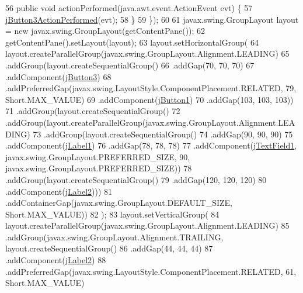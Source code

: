 \begin{DoxyCode}
56             \textcolor{keyword}{public} \textcolor{keywordtype}{void} actionPerformed(java.awt.event.ActionEvent evt) \{
57                 \mbox{\hyperlink{class_interfaz_package_1_1_comprar_libro_a27ea605530e2903b8f6b112e28f174af}{jButton3ActionPerformed}}(evt);
58             \}
59         \});
60 
61         javax.swing.GroupLayout layout = \textcolor{keyword}{new} javax.swing.GroupLayout(getContentPane());
62         getContentPane().setLayout(layout);
63         layout.setHorizontalGroup(
64             layout.createParallelGroup(javax.swing.GroupLayout.Alignment.LEADING)
65             .addGroup(layout.createSequentialGroup()
66                 .addGap(70, 70, 70)
67                 .addComponent(\mbox{\hyperlink{class_interfaz_package_1_1_comprar_libro_a911d2c0fd76d0d219563ebd3ddc851b0}{jButton3}})
68                 .addPreferredGap(javax.swing.LayoutStyle.ComponentPlacement.RELATED, 79, Short.MAX\_VALUE)
69                 .addComponent(\mbox{\hyperlink{class_interfaz_package_1_1_comprar_libro_add5c058f4090954bd33f186540441d18}{jButton1}})
70                 .addGap(103, 103, 103))
71             .addGroup(layout.createSequentialGroup()
72                 .addGroup(layout.createParallelGroup(javax.swing.GroupLayout.Alignment.LEADING)
73                     .addGroup(layout.createSequentialGroup()
74                         .addGap(90, 90, 90)
75                         .addComponent(\mbox{\hyperlink{class_interfaz_package_1_1_comprar_libro_a6f76d43eea40102ddff5d882389f306e}{jLabel1}})
76                         .addGap(78, 78, 78)
77                         .addComponent(\mbox{\hyperlink{class_interfaz_package_1_1_comprar_libro_aefb13deeb30da3f6668b192b74c20705}{jTextField1}}, javax.swing.GroupLayout.PREFERRED\_SIZE, 90, 
      javax.swing.GroupLayout.PREFERRED\_SIZE))
78                     .addGroup(layout.createSequentialGroup()
79                         .addGap(120, 120, 120)
80                         .addComponent(\mbox{\hyperlink{class_interfaz_package_1_1_comprar_libro_ae3f9a64fb4e0e0131c4ccee88f410226}{jLabel2}})))
81                 .addContainerGap(javax.swing.GroupLayout.DEFAULT\_SIZE, Short.MAX\_VALUE))
82         );
83         layout.setVerticalGroup(
84             layout.createParallelGroup(javax.swing.GroupLayout.Alignment.LEADING)
85             .addGroup(javax.swing.GroupLayout.Alignment.TRAILING, layout.createSequentialGroup()
86                 .addGap(44, 44, 44)
87                 .addComponent(\mbox{\hyperlink{class_interfaz_package_1_1_comprar_libro_ae3f9a64fb4e0e0131c4ccee88f410226}{jLabel2}})
88                 .addPreferredGap(javax.swing.LayoutStyle.ComponentPlacement.RELATED, 61, Short.MAX\_VALUE)

\end{DoxyCode}
